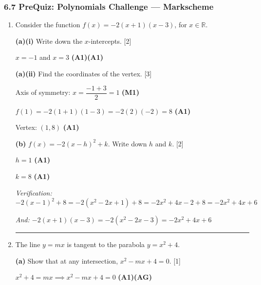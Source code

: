 \documentclass[12pt, twoside]{article}
\begin{document}
\subsubsection*{6.7 PreQuiz: Polynomials Challenge --- Markscheme}

\begin{enumerate}[itemsep=0.3cm]

\item[1.] [Maximum mark: 7]

Consider the function $f(x) = -2(x + 1)(x - 3)$, for $x \in \mathbb{R}$.

\medskip

\textbf{(a)(i)} Write down the $x$-intercepts. \hfill [2]

$x = -1$ and $x = 3$ \hfill \textbf{(A1)(A1)}

\medskip

\textbf{(a)(ii)} Find the coordinates of the vertex. \hfill [3]

Axis of symmetry: $x = \dfrac{-1 + 3}{2} = 1$ \hfill \textbf{(M1)}

$f(1) = -2(1 + 1)(1 - 3) = -2(2)(-2) = 8$ \hfill \textbf{(A1)}

Vertex: $(1, 8)$ \hfill \textbf{(A1)}

\medskip

\textbf{(b)} $f(x) = -2(x - h)^2 + k$. Write down $h$ and $k$. \hfill [2]

$h = 1$ \hfill \textbf{(A1)}

$k = 8$ \hfill \textbf{(A1)}

\emph{Verification: $-2(x - 1)^2 + 8 = -2(x^2 - 2x + 1) + 8
= -2x^2 + 4x - 2 + 8 = -2x^2 + 4x + 6$}

\emph{And: $-2(x + 1)(x - 3) = -2(x^2 - 2x - 3) = -2x^2 + 4x + 6$ \checkmark}

\bigskip
\hrule
\bigskip

\item[2.] [Maximum mark: 7]

The line $y = mx$ is tangent to the parabola $y = x^2 + 4$.

\medskip

\textbf{(a)} Show that at any intersection, $x^2 - mx + 4 = 0$. \hfill [1]

$x^2 + 4 = mx \implies x^2 - mx + 4 = 0$ \hfill \textbf{(A1)(AG)}

\medskip


\end{enumerate}
\end{document}
